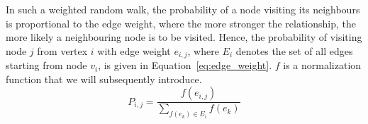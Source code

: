 In such a weighted random walk, the probability of a node visiting its neighbours is proportional to the edge weight, where the more stronger the relationship, the more likely a neighbouring node is to be visited. Hence, the probability of visiting node $j$ from vertex $i$ with edge weight $e_{i,j}$, where $ E_{ i }$ denotes the set of all edges starting from node $v_{i}$, is given in Equation~\ref{eq:edge_weight}. $f$ is a normalization function that we will subsequently introduce.
\begin{equation}
P_{i,j}=\frac{f(e_{i,j})}{\sum _{ f(e_ k )\in E_{ i } }^{  }{ f(e_k) } }
\label{eq:edge_weight}
\end{equation}


